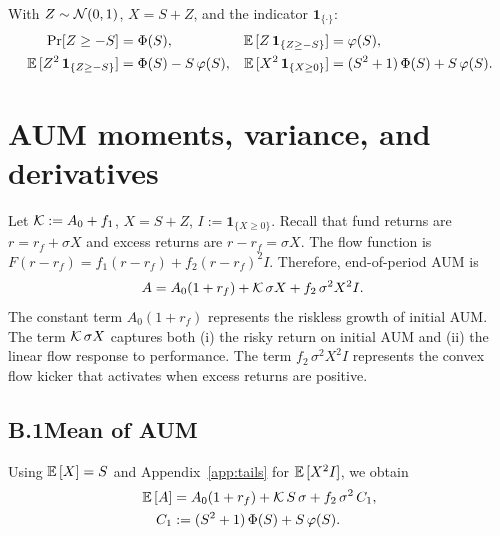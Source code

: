 \begin{lemma}
\label{lem:tails}
With $Z\sim\mathcal{N}(0,1)$, $X=S+Z$, and the indicator $\mathbf 1_{\{\cdot\}}$:
\begin{align*}
\Pr[Z\ge -S] &= \Phi(S), & {\mathbb{E}}\,[Z\,\mathbf 1_{\{Z\ge -S\}}] &= \varphi(S),\\
{\mathbb{E}}\,[Z^2\,\mathbf 1_{\{Z\ge -S\}}] &= \Phi(S) - S\,\varphi(S), & {\mathbb{E}}\,[X^2\,\mathbf 1_{\{X\ge 0\}}] &= (S^2+1)\,\Phi(S) + S\,\varphi(S).
\end{align*}
\end{lemma}

\section{AUM moments, variance, and derivatives}
\label{app:variance}
Let $\mathcal{K}:=A_0+f_1$, $X=S+Z$, $I:=\mathbf 1_{\{X\ge 0\}}$. Recall that fund returns are $r=r_f+\sigma X$ and excess returns are $r-r_f=\sigma X$. The flow function is $F(r-r_f)=f_1(r-r_f)+f_2(r-r_f)^2 I$. Therefore, end-of-period AUM is
\begin{align}
A &= A_0(1+r_f) + \mathcal{K}\,\sigma X + f_2\,\sigma^2 X^2 I.
\end{align}
The constant term $A_0(1+r_f)$ represents the riskless growth of initial AUM. The term $\mathcal{K}\,\sigma X$ captures both (i) the risky return on initial AUM and (ii) the linear flow response to performance. The term $f_2\,\sigma^2 X^2 I$ represents the convex flow kicker that activates when excess returns are positive.

\subsection*{B.1\quad Mean of AUM}
Using ${\mathbb{E}}\,[X]=S$ and Appendix~\ref{app:tails} for ${\mathbb{E}}\,[X^2 I]$, we obtain
\begin{align}
{\mathbb{E}}\,[A] &= A_0(1+r_f) + \mathcal{K}\,S\,\sigma + f_2\,\sigma^2\,C_1,\label{eq:EA-correct}\\
C_1 &:= (S^2+1)\,\Phi(S) + S\,\varphi(S).\label{eq:C1-app}
\end{align}

